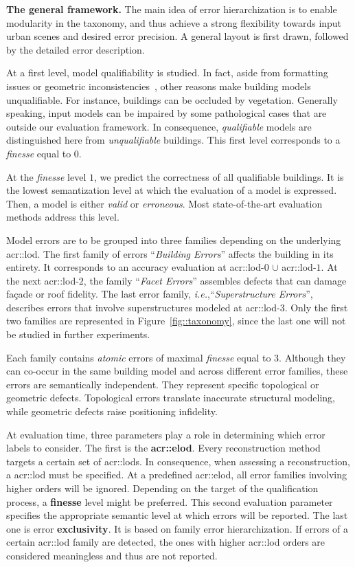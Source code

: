 \documentclass[runningheads]{llncs}
\begin{document}
\noindent
\textbf{The general framework.}
The main idea of error hierarchization is to enable modularity in the taxonomy, and thus achieve a strong flexibility towards input urban scenes and desired error precision. A general layout is first drawn, followed by the detailed error description.

At a first level, model qualifiability is studied. In fact, aside from formatting issues or geometric inconsistencies~\cite{ledoux2018val3dity}, other reasons make building models unqualifiable. For instance, buildings can be occluded by vegetation. Generally speaking, input models can be impaired by some pathological cases that are outside our evaluation framework. In consequence, \textit{qualifiable} models are distinguished here from \textit{unqualifiable} buildings. This first level corresponds to a \textit{finesse} equal to $0$.

At the \textit{finesse} level $1$, we predict the correctness of all qualifiable buildings. It is the lowest semantization level at which the evaluation of a model is expressed. Then, a model is either \textit{valid} or \textit{erroneous}. Most state-of-the-art evaluation methods address this level.

Model errors are to be grouped into three families depending on the underlying \acrshort{acr::lod}. The first family of errors ``\textit{Building Errors}'' affects the building in its entirety. It corresponds to an accuracy evaluation at \acrshort{acr::lod}-$0$ $\cup$ \acrshort{acr::lod}-$1$. At the next \acrshort{acr::lod}-$2$, the family ``\textit{Facet Errors}'' assembles defects that can damage fa\c{c}ade or roof fidelity. The last error family, \textit{i.e.},``\textit{Superstructure Errors}'', describes errors that involve superstructures modeled at \acrshort{acr::lod}-$3$. Only the first two families are represented in Figure~\ref{fig::taxonomy}, since the last one will not be studied in further experiments.

Each family contains \textit{atomic} errors of maximal \textit{finesse} equal to $3$. Although they can co-occur in the same building model and across different error families, these errors are semantically independent. They represent specific topological or geometric defects. Topological errors translate inaccurate structural modeling, while geometric defects raise positioning infidelity.

At evaluation time, three parameters play a role in determining which error labels to consider. The first is the \textbf{\acrfull{acr::elod}}. Every reconstruction method targets a certain set of \glspl{acr::lod}. In consequence, when assessing a reconstruction, a \acrshort{acr::lod} must be specified. At a predefined \acrshort{acr::elod}, all error families involving higher orders will be ignored. Depending on the target of the qualification process, a \textbf{finesse} level might be preferred. This second evaluation parameter specifies the appropriate semantic level at which errors will be reported. The last one is error \textbf{exclusivity}. It is based on family error hierarchization. If errors of a certain \acrshort{acr::lod} family are detected, the ones with higher \acrshort{acr::lod} orders are considered meaningless and thus are not reported.
\end{document}
